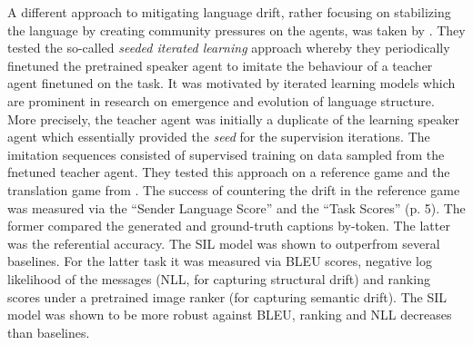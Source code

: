 
A different approach to mitigating language drift, rather focusing on stabilizing the language by creating community pressures on the agents, was taken by \cite{lu2020countering}. They tested the so-called \textit{seeded iterated learning} approach whereby they periodically finetuned the pretrained speaker agent to imitate the behaviour of a teacher agent finetuned on the task. It was motivated by iterated learning models which are prominent in research on emergence and evolution of language structure. More precisely, the teacher agent was initially a duplicate of the learning speaker agent which essentially provided the \textit{seed} for the supervision iterations. The imitation sequences consisted of supervised training on data sampled from the fnetuned teacher agent. They tested this approach on a reference game and the translation game from \cite{lee2019countering}. The success of countering the drift in the reference game was measured via the ``Sender Language Score'' and the ``Task Scores'' (p. 5). The former compared the generated and ground-truth captions by-token. The latter was the referential accuracy. The SIL model was shown to outperfrom several baselines.
For the latter task it was measured via BLEU scores, negative log likelihood of the messages (NLL, for capturing structural drift) and ranking scores under a pretrained image ranker (for capturing semantic drift). The SIL model was shown to be more robust against BLEU, ranking and NLL decreases than baselines.

